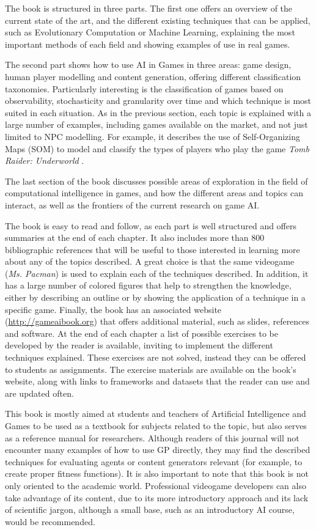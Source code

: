 \documentclass{article}
\begin{document}
The book is structured in three parts. The first one offers an overview of the current state of the art, and the different existing techniques that can be applied, such as Evolutionary Computation or Machine Learning, explaining the most important methods of each field and showing examples of use in real games. 

The second part shows how to use AI in Games in three areas: game design, human player modelling and content generation, offering different classification taxonomies. Particularly interesting is the classification of games based on observability, stochasticity and granularity over time and which technique is most suited in each situation. As in the previous section, each topic is explained with a large number of examples, including games available on the market, and not just limited to NPC modelling. For example, it describes the use of Self-Organizing Maps (SOM) to model and classify the types of players who play the game {\em Tomb Raider: Underworld} \cite{MahlmannDTCY10}.

The last section of the book discusses possible areas of exploration in the field of computational intelligence in games, and how the different areas and topics can interact, as well as the frontiers of the current research on game AI.

The book is easy to read and follow, as each part is well structured and offers summaries at the end of each chapter. It also includes more than 800 bibliographic references that will be useful to those interested in learning more about any of the topics described. A great choice is that the same videogame ({\em Ms. Pacman}) is used to explain each of the techniques described. In addition, it has a large number of colored figures that help to strengthen the knowledge, either by describing an outline or by showing the application of a technique in a specific game. Finally, the book has an associated website (\url{http://gameaibook.org}) that offers additional material, such as slides, references and software. At the end of each chapter a list of possible exercises to be developed by the reader is available, inviting to implement the different techniques explained. These exercises are not solved, instead they can be offered to students as assignments. The exercise materials are available on the book's website, along with links to frameworks and datasets that the reader can use and are updated often. 

This book is mostly aimed at students and teachers of Artificial Intelligence and Games to be used as a textbook for subjects related to the topic, but also serves as a reference manual for researchers.  Although readers of this journal will not encounter many examples of how to use GP directly, they may find the described techniques for evaluating agents or content generators relevant (for example, to create proper fitness functions). It is also important to note that this book is not only oriented to the academic world. Professional videogame developers can also take advantage of its content, due to its more introductory approach and its lack of scientific jargon, although a small base, such as an introductory AI course, would be recommended.



\end{document}
